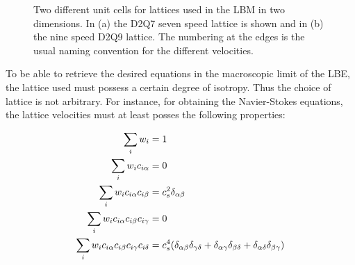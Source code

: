 \begin{figure}
  \centering
  \hspace{15pt} 
  \caption[Two different unit cells for lattices used in the LBM in two
    dimensions.]{Two different unit cells for lattices used in the LBM in two
    dimensions. In (a) the D2Q7 seven speed lattice is shown and in
    (b) the nine speed D2Q9 lattice. The numbering at the edges is the
    usual naming convention for the different velocities.}
  \label{fig:lbm:lattices}
\end{figure}
 
To be able to retrieve the desired equations in the macroscopic limit
of the LBE, the lattice used must possess a certain degree of
isotropy. Thus the choice of lattice is not arbitrary. For instance,
for obtaining the Navier-Stokes equations, the lattice velocities must
at least posses the following properties:

\begin{subequations}\label{eq:lbm:i0}\label{eq:lbm:i1}\label{eq:lbm:i2}\label{eq:lbm:i3}\label{eq:lbm:i4}
\begin{align}
\sum_i w_i &= 1\\
\sum_i w_ic_{i\alpha} &= 0 \\
\sum_i w_ic_{i\alpha}c_{i\beta} &= c_s^2\delta_{\alpha \beta}\\
\sum_i w_ic_{i\alpha}c_{i\beta}c_{i\gamma} &= 0\\
\sum_i w_ic_{i\alpha}c_{i\beta}c_{i\gamma}c_{i\delta} &= c_s^4(\delta_{\alpha\beta}\delta_{\gamma\delta}+ \delta_{\alpha\gamma}\delta_{\beta\delta} +\delta_{\alpha\delta}\delta_{\beta\gamma})
\end{align}
\end{subequations}

